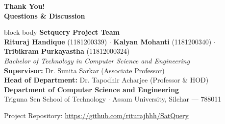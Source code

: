 \documentclass[aspectratio=169, 10pt]{beamer}
\begin{document}
\begin{frame}[plain]
  \begin{center}
    \vspace{0.4em}
    {\LARGE\color{IEEEDarkBlue}\textbf{Thank You!}}\\[0.3em]
    {\normalsize\color{IEEEBlue}\textbf{Questions \& Discussion}}\\[0.8em]

    \begin{beamercolorbox}[wd=0.88\textwidth, rounded=true, shadow=false, center]{block body}
      \vspace{0.3em}
      \textbf{\normalsize Setquery Project Team}\\[0.25em]
      \scriptsize
      \textbf{Rituraj Handique} (1181200339) $\cdot$ \textbf{Kalyan Mohanti} (1181200340) $\cdot$ \textbf{Tribikram Purkayastha} (11812000324)\\[0.15em]
      \textit{Bachelor of Technology in Computer Science and Engineering}\\[0.3em]
      \textbf{Supervisor:} Dr. Sunita Sarkar (Associate Professor)\\
      \textbf{Head of Department:} Dr. Tapodhir Acharjee (Professor \& HOD)\\[0.2em]
      \textbf{Department of Computer Science and Engineering}\\
      Triguna Sen School of Technology $\cdot$ Assam University, Silchar --- 788011\\
      \vspace{0.3em}
    \end{beamercolorbox}

    \vspace{0.4em}
    {\scriptsize\color{IEEEDarkGray} Project Repository: \url{https://github.com/riturajhhh/SatQuery}}
  \end{center}
\end{frame}
\end{document}

